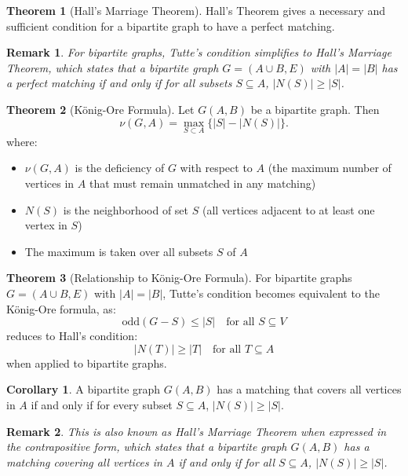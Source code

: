 \documentclass{article}
\newtheorem{remark}{Remark}
\theoremstyle{definition}
\newtheorem{theorem}{Theorem}
\newtheorem{corollary}{Corollary}
\begin{document}
\begin{theorem}[Hall's Marriage Theorem]
Hall's Theorem gives a necessary and sufficient condition for a bipartite graph to have a perfect matching.
\end{theorem}

\begin{remark}
For bipartite graphs, Tutte's condition simplifies to Hall's Marriage Theorem, which states that a bipartite graph $G = (A \cup B, E)$ with $|A| = |B|$ has a perfect matching if and only if for all subsets $S \subseteq A$, $|N(S)| \geq |S|$.
\end{remark}

\begin{theorem}[König-Ore Formula]
Let $G(A, B)$ be a bipartite graph. Then
\[
\nu(G, A) = \max_{S \subset A} \{|S| - |N(S)|\}.
\]
where:
\begin{itemize}
    \item $\nu(G, A)$ is the deficiency of $G$ with respect to $A$ (the maximum number of vertices in $A$ that must remain unmatched in any matching)
    \item $N(S)$ is the neighborhood of set $S$ (all vertices adjacent to at least one vertex in $S$)
    \item The maximum is taken over all subsets $S$ of $A$
\end{itemize}
\end{theorem}

\begin{theorem}[Relationship to König-Ore Formula]
For bipartite graphs $G = (A \cup B, E)$ with $|A| = |B|$, Tutte's condition becomes equivalent to the König-Ore formula, as:
\[
\text{odd}(G - S) \leq |S| \quad \text{for all } S \subseteq V
\]
reduces to Hall's condition:
\[
|N(T)| \geq |T| \quad \text{for all } T \subseteq A
\]
when applied to bipartite graphs.
\end{theorem}

\begin{corollary}
A bipartite graph $G(A, B)$ has a matching that covers all vertices in $A$ if and only if for every subset $S \subseteq A$, $|N(S)| \geq |S|$.
\end{corollary}

\begin{remark}
This is also known as Hall's Marriage Theorem when expressed in the contrapositive form, which states that a bipartite graph $G(A, B)$ has a matching covering all vertices in $A$ if and only if for all $S \subseteq A$, $|N(S)| \geq |S|$.
\end{remark}
\end{document}
